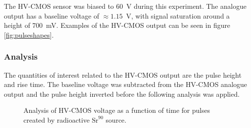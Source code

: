 The HV-CMOS sensor was biased to 60~V during this experiment.  The analogue output has a baseline voltage of $\approx 1.15$~V, with signal saturation around a height of 700~mV.  Examples of the HV-CMOS output can be seen in figure \ref{fig:pulseshapes}.


\subsubsection{Analysis}

The quantities of interest related to the HV-CMOS output are the pulse height and rise time.  The baseline voltage was subtracted from the HV-CMOS analogue output and the pulse height inverted before the following analysis was applied.

\begin{figure}
\centering


\hfill

\caption[Analysis of HV-CMOS voltage as a function of time for pulses created by radioactive strontium 90 source.]{Analysis of HV-CMOS voltage as a function of time for pulses created by radioactive $\text{Sr}^{90}$ source.}

\label{fig:pulseshapeanalysis}
\end{figure}

